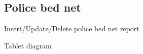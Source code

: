 \documentclass[letterpaper,10pt,english,openany,oneside]{sphinxmanual}
\begin{document}
\subsection{Police bed net}
\label{\detokenize{module/module:police-bed-net}}
\sphinxAtStartPar
Insert/Update/Delete police bed net report

\sphinxAtStartPar
Tablet diagram

\begin{sphinxVerbatim}[commandchars=\\\{\}]
         
                                        
      
                                        
         
\end{sphinxVerbatim}
\end{document}
